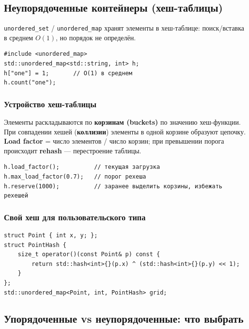 \subsection{Неупорядоченные контейнеры (хеш-таблицы)}

\texttt{unordered\_set} / \texttt{unordered\_map} хранят элементы в хеш-таблице:
поиск/вставка в среднем $O(1)$, но порядок не определён.

\begin{lstlisting}
#include <unordered_map>
std::unordered_map<std::string, int> h;
h["one"] = 1;       // O(1) в среднем
h.count("one");
\end{lstlisting}

\subsubsection{Устройство хеш-таблицы}

Элементы раскладываются по \textbf{корзинам (buckets)} по значению хеш-функции.
При совпадении хешей (\textbf{коллизии}) элементы в одной корзине образуют цепочку.
\textbf{Load factor} = число элементов / число корзин; при превышении порога
происходит \textbf{rehash} --- перестроение таблицы.

\begin{lstlisting}
h.load_factor();          // текущая загрузка
h.max_load_factor(0.7);   // порог рехеша
h.reserve(1000);          // заранее выделить корзины, избежать рехешей
\end{lstlisting}

\subsubsection{Свой хеш для пользовательского типа}

\begin{lstlisting}
struct Point { int x, y; };
struct PointHash {
    size_t operator()(const Point& p) const {
        return std::hash<int>{}(p.x) ^ (std::hash<int>{}(p.y) << 1);
    }
};
std::unordered_map<Point, int, PointHash> grid;
\end{lstlisting}

\subsection{Упорядоченные vs неупорядоченные: что выбрать}

